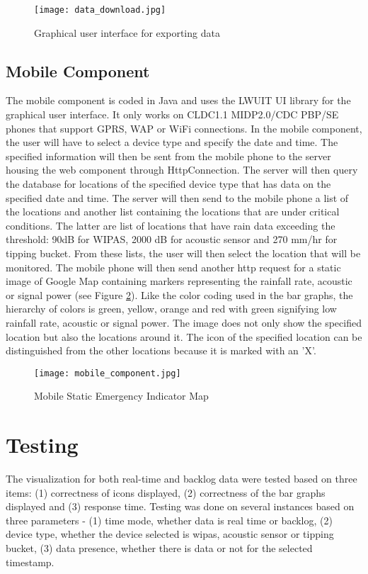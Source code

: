 \begin{figure}
    \centering
        \texttt{[image: data\_download.jpg]}
    \caption{Graphical user interface for exporting data}
    \label{fig:data_downloading}
\end{figure}

\subsection{Mobile Component}
The mobile component is coded in Java and uses the LWUIT UI library for the graphical user interface. It only works on CLDC1.1 MIDP2.0/CDC PBP/SE phones that support GPRS, WAP or WiFi connections.  In the mobile component, the user will have to select a device type and specify the date and time. The specified information will then be sent from the mobile phone to the server housing the web component through HttpConnection. The server will then query the database for locations of the specified device type that has data on the specified date and time. The server will then send to the mobile phone a list of the locations and another list containing the locations that are under critical conditions. The latter are list of locations that have rain data exceeding the threshold: 90dB for WIPAS, 2000 dB for acoustic sensor and 270 mm/hr for tipping bucket. From these lists, the user will then select the location that will be monitored. The mobile phone will then send another http request for a static image of Google Map containing markers representing the rainfall rate, acoustic or signal power (see Figure \ref{fig:mobile_component}). Like the color coding used in the bar graphs, the hierarchy of colors is green, yellow, orange and red with green signifying low rainfall rate, acoustic or signal power.  The image does not only show the specified location but also the locations around it. The icon of the specified location can be distinguished from the other locations because it is marked with an 'X'.

\begin{figure}
    \centering
        \texttt{[image: mobile\_component.jpg]}
    \caption{Mobile Static Emergency Indicator Map}
    \label{fig:mobile_component}
\end{figure}

\section{Testing}
The visualization for both real-time and backlog data were tested based on three items: (1) correctness of icons displayed, (2) correctness of the bar graphs displayed and (3) response time. Testing was done on several instances based on three parameters - (1) time mode, whether data is real time or backlog, (2) device type, whether the device selected is wipas, acoustic sensor or tipping bucket, (3) data presence, whether there is data or not for the selected timestamp.